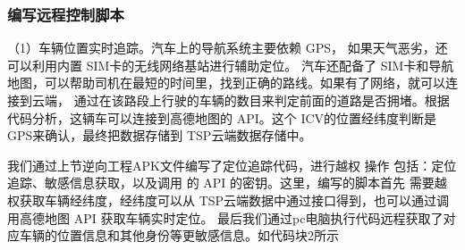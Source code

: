 \subsubsection{编写远程控制脚本}
（1）车辆位置实时追踪。汽车上的导航系统主要依赖 GPS，
如果天气恶劣，还可以利用内置 SIM卡的无线网络基站进行辅助定位。
汽车还配备了 SIM卡和导航地图，可以帮助司机在最短的时间里，找到正确的路线。如果有了网络，就可以连接到云端，
通过在该路段上行驶的车辆的数目来判定前面的道路是否拥堵。根据代码分析，这辆车可以连接到高德地图的 API。这个 ICV的位置经纬度判断是
GPS来确认，最终把数据存储到 TSP云端数据存储中。

我们通过上节逆向工程APK文件编写了定位追踪代码，进行越权
操作 包括：定位追踪、敏感信息获取，以及调用
的 API 的密钥。这里，编写的脚本首先
需要越权获取车辆经纬度，经纬度可以从 TSP云端数据中通过接口得到，也可以通过调用高德地图 API 获取车辆实时定位。
最后我们通过pc电脑执行代码远程获取了对应车辆的位置信息和其他身份等更敏感信息。如代码块2所示

